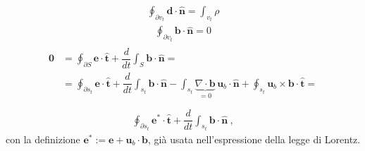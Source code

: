 \documentclass[letterpaper,10pt,english]{jupyterBook}
\begin{document}
\begin{equation*}
\begin{split}
    \oint_{\partial v_t} \mathbf{d} \cdot \mathbf{\hat{n}} = \int_{v_t} \rho
\end{split}
\end{equation*}
\sphinxAtStartPar
{}
\begin{equation*}
\begin{split}
    \oint_{\partial v_t} \mathbf{b} \cdot \mathbf{\hat{n}} = 0
\end{split}
\end{equation*}
\sphinxAtStartPar
{}
\begin{equation*}
\begin{split}\begin{aligned}
   \mathbf{0} & = \oint_{\partial S} \mathbf{e} \cdot \hat{\mathbf{t}} + \dfrac{d}{dt} \int_{S} \mathbf{b} \cdot \hat{\mathbf{n}} = \\
    & = \oint_{\partial s_t} \mathbf{e} \cdot \hat{\mathbf{t}} + \dfrac{d}{dt} \int_{s_t} \mathbf{b} \cdot \hat{\mathbf{n}} - \int_{s_t} \underbrace{\nabla \cdot \mathbf{b}}_{=0} \, \mathbf{u}_b \cdot \hat{\mathbf{n}} + \oint_{s_t} \mathbf{u}_b \times \mathbf{b} \cdot \hat{\mathbf{t}} =  \\
\end{aligned}\end{split}
\end{equation*}\begin{equation*}
\begin{split}
    \oint_{\partial s_t} \mathbf{e}^* \cdot \hat{\mathbf{t}} + \dfrac{d}{dt} \int_{s_t} \mathbf{b} \cdot \hat{\mathbf{n}} \ ,
\end{split}
\end{equation*}
\sphinxAtStartPar
con la definizione \(\mathbf{e}^* := \mathbf{e} + \mathbf{u}_b \cdot \mathbf{b}\), già usata nell’espressione della legge di Lorentz.
\end{document}
